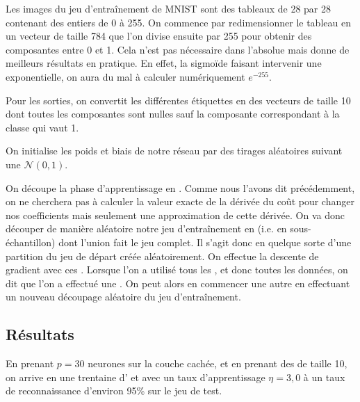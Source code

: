 Les images du jeu d'entraînement de \textsc{MNIST} sont des 
tableaux de 28 par 28 contenant des entiers de 0 à 255.
On commence par redimensionner le tableau en un vecteur 
de taille 784 que l'on divise ensuite par 255 pour obtenir 
des composantes entre 0 et 1. 
Cela n'est pas nécessaire dans l'absolue mais donne de 
meilleurs résultats en pratique.
En effet, la sigmoïde faisant intervenir une exponentielle, 
on aura du mal à calculer numériquement $e^{-255}$.

Pour les sorties, on convertit les différentes étiquettes 
en des vecteurs de taille 10 dont toutes les composantes 
sont nulles sauf la composante correspondant à la classe 
qui vaut 1.

On initialise les poids et biais de notre réseau par des 
tirages aléatoires suivant une $\mathcal{N}(0, 1)$.

On découpe la phase d'apprentissage en . 
Comme nous l'avons dit précédemment, on ne cherchera pas 
à calculer la valeur exacte de la dérivée du coût 
pour changer nos coefficients mais seulement une 
approximation de cette dérivée.
On va donc découper de manière aléatoire notre jeu 
d'entraînement en  (i.e. en sous-échantillon) 
dont l'union fait le jeu complet.
Il s'agit donc en quelque sorte d'une partition du 
jeu de départ créée aléatoirement.
On effectue la descente de gradient avec ces 
. 
Lorsque l'on a utilisé tous les , 
et donc toutes les données, on dit que l'on a 
effectué une .
On peut alors en commencer une autre en effectuant un 
nouveau découpage aléatoire du jeu d'entraînement.


\subsection{Résultats}


En prenant $p = 30$ neurones sur la couche cachée, et 
en prenant des  de taille 10, 
on arrive en une trentaine d' et avec 
un taux d'apprentissage $\eta = 3,0$ à un taux de 
reconnaissance d'environ 95\% sur le jeu de test.
